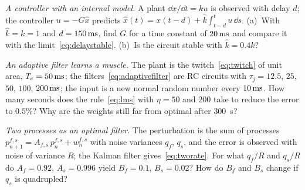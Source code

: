 \begin{exercise}[\lvlB]
\label{ex:15:5}
\emph{A controller with an internal model.} A plant $\dd x/\dd t=ku$ is observed with delay $d$; the controller $u=-G\hat x$ predicts $\hat x(t)=x(t-d)+\hat k\int_{t-d}^{t}u\,\dd s$. (a)~With $\hat k=k=1$ and $d=150\,\text{ms}$, find $G$ for a time constant of $20\,\text{ms}$ and compare it with the limit~\eqref{eq:delaystable}. (b)~Is the circuit stable with $\hat k=0.4k$?
\end{exercise}

\begin{exercise}[\lvlB]
\label{ex:15:6}
\emph{An adaptive filter learns a muscle.} The plant is the twitch~\eqref{eq:twitch} of unit area, $T_c=50\,\text{ms}$; the filters~\eqref{eq:adaptivefilter} are RC circuits with $\tau_j=12.5$, $25$, $50$, $100$, $200\,\text{ms}$; the input is a new normal random number every $10\,\text{ms}$. How many seconds does the rule~\eqref{eq:lms} with $\eta=50$ and $200$ take to reduce the error to $0.5\%$? Why are the weights still far from optimal after $300$~s?
\end{exercise}

\begin{exercise}[\lvlC]
\label{ex:15:7}
\emph{Two processes as an optimal filter.} The perturbation is the sum of processes $p^{f,s}_{n+1}=A_{f,s}\,p^{f,s}_n+w^{f,s}_n$ with noise variances $q_f$, $q_s$, and the error is observed with noise of variance $R$; the Kalman filter gives~\eqref{eq:tworate}. For what $q_f/R$ and $q_s/R$ do $A_f=0.92$, $A_s=0.996$ yield $B_f=0.1$, $B_s=0.02$? How do $B_f$ and $B_s$ change if $q_s$ is quadrupled?
\end{exercise}
